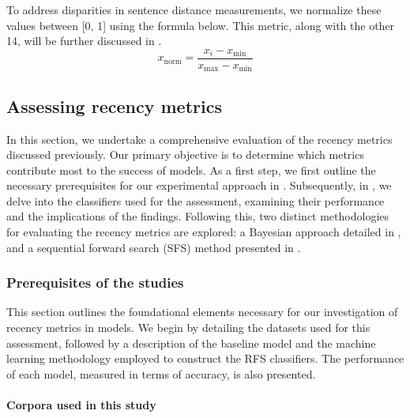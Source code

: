 \begin{description}[leftmargin=0cm]
	\item[Scaled/normalized sentence distance.] 
	To address disparities in sentence distance measurements, we normalize these values between [0, 1] using the formula below. This metric, along with the other 14, will be further discussed in .
	\[
		x_{\text{norm}} = \frac{x_i - x_{\min}}{x_{\max} - x_{\min}}
	\]
\end{description}




\subsection{Assessing recency metrics}\label{sec:studyc}

In this section, we undertake a comprehensive evaluation of the recency metrics discussed previously. Our primary objective is to determine which metrics contribute most to the success of \context models. As a first step, we first outline the necessary prerequisites for our experimental approach in . Subsequently, in , we delve into the classifiers used for the assessment, examining their performance and the implications of the findings. Following this, two distinct methodologies for evaluating the recency metrics are explored: a Bayesian approach detailed in , and a sequential forward search (SFS) method presented in .



\subsubsection{Prerequisites of the studies}\label{sec:methodology}

This section outlines the foundational elements necessary for our investigation of recency metrics in \context models. We begin by detailing the datasets used for this assessment, followed by a description of the baseline model and the machine learning methodology employed to construct the RFS classifiers. The performance of each model, measured in terms of accuracy, is also presented.

\paragraph*{Corpora used in this study}\label{subsec:corpora}

